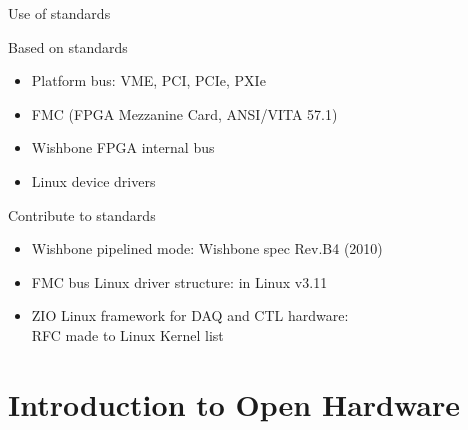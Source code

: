\documentclass[compress,red]{beamer}
\begin{document}
\begin{frame}{Use of standards}

  \begin{block}{Based on standards}
    \begin{itemize}
    \item Platform bus: VME, PCI, PCIe, PXIe
    \item FMC (FPGA Mezzanine Card, ANSI/VITA 57.1)
    \item Wishbone FPGA internal bus
    \item Linux device drivers
    \end{itemize}
  \end{block}

  \begin{block}{Contribute to standards}
    \begin{itemize}
    \item Wishbone pipelined mode: Wishbone spec Rev.B4 (2010)
    \item FMC bus Linux driver structure: in Linux v3.11
    \item ZIO Linux framework for DAQ and CTL hardware: \\ RFC made to Linux Kernel list
    \end{itemize}
  \end{block}


\end{frame}


\section[Introduction to OH]{Introduction to Open Hardware}

\subsection*{} %
\end{document}
